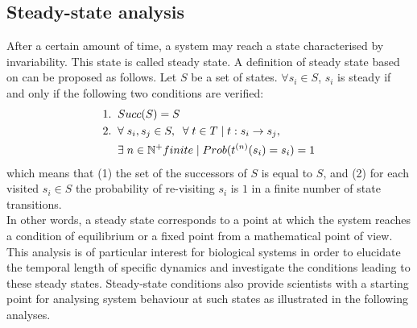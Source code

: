 \subsection{Steady-state analysis}
\label{subsec:Steady-state analysis}
After a certain amount of time, a system may reach a state characterised by invariability. This state is called steady state. A definition of steady state based on \citep{Garg2007, Ay2009} can be proposed as follows. Let $S$ be a set of states. $\forall s_i \in S$, $s_i$ is steady if and only if the following two conditions are verified:
\begin{align}
\label{eq:steady_state_analysis}
 1.\;\; & Succ(S) = S \\
 2.\;\; & \forall\; s_i,s_j \in S,\;\; \forall\; t \in T\;|\; t : s_i \rightarrow s_j,  \notag \\
        & \exists\; n \in \mathbb{N^{+}} finite \; | \; Prob(t^{(n)}(s_i)=s_i) = 1 \notag  
\end{align}
which means that (1) the set of the successors of $S$ is equal to $S$, and (2) for each visited $s_i \in S$ the probability of re-visiting $s_i$ is $1$ in a finite number of state transitions.\\
In other words, a steady state corresponds to a point at which the system reaches a condition of equilibrium or a fixed point from a mathematical point of view. This analysis is of particular interest for biological systems in order to elucidate the temporal length of specific dynamics and investigate the conditions leading to these steady states. Steady-state conditions also provide scientists with a starting point for analysing system behaviour at such states as illustrated in the following analyses.

